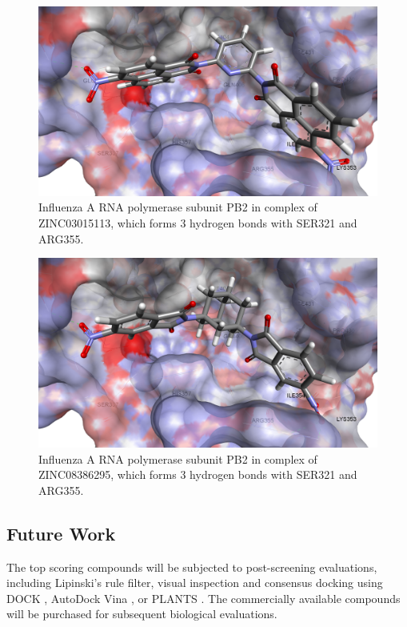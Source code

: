 \begin{figure}
\centering
\includegraphics[width=\linewidth]{Case/2VQZ-ZINC03015113.png}
\caption{Influenza A RNA polymerase subunit PB2 in complex of ZINC03015113, which forms 3 hydrogen bonds with SER321 and ARG355.}
\label{Case:2VQZ-ZINC03015113}
\end{figure}

\begin{figure}
\centering
\includegraphics[width=\linewidth]{Case/2VQZ-ZINC08386295.png}
\caption{Influenza A RNA polymerase subunit PB2 in complex of ZINC08386295, which forms 3 hydrogen bonds with SER321 and ARG355.}
\label{Case:2VQZ-ZINC08386295}
\end{figure}

\subsection{Future Work}

The top scoring compounds will be subjected to post-screening evaluations, including Lipinski’s rule filter, visual inspection and consensus docking using DOCK \citep{1222}, AutoDock Vina \citep{595}, or PLANTS \citep{610,607,779}. The commercially available compounds will be purchased for subsequent biological evaluations.

